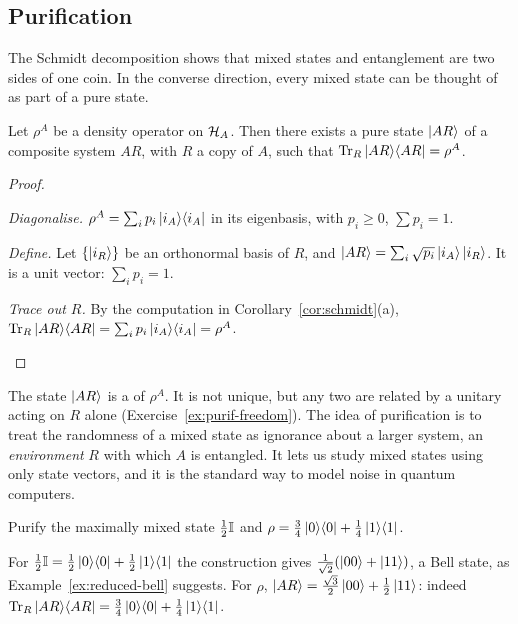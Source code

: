 \subsection{Purification}

The Schmidt decomposition shows that mixed states and entanglement are two sides of one coin. In the converse direction, every mixed state can be thought of as part of a pure state.

\begin{proposition}[Purification]\label{prop:purification}
  Let $\rho^A$ be a density operator on $\mathcal{H}_A$. Then there exists a pure state $\left|AR\right\rangle$ of a composite system $AR$, with $R$ a copy of $A$, such that $\operatorname{Tr}_R\left|AR\right\rangle\!\left\langle AR\right|=\rho^A$.
\end{proposition}
\begin{proof}
  \begin{steps}
    \item \emph{Diagonalise.} $\rho^A=\sum_ip_i\left|i_A\right\rangle\!\left\langle i_A\right|$ in its eigenbasis, with $p_i\ge0$, $\sum p_i=1$.
    \item \emph{Define.} Let $\{\left|i_R\right\rangle\}$ be an orthonormal basis of $R$, and $\left|AR\right\rangle=\sum_i\sqrt{p_i}\left|i_A\right\rangle\left|i_R\right\rangle$. It is a unit vector: $\sum_ip_i=1$.
    \item \emph{Trace out $R$.} By the computation in Corollary~\ref{cor:schmidt}(a), $\operatorname{Tr}_R\left|AR\right\rangle\!\left\langle AR\right|=\sum_ip_i\left|i_A\right\rangle\!\left\langle i_A\right|=\rho^A$. \qedhere
  \end{steps}
\end{proof}

The state $\left|AR\right\rangle$ is a  of $\rho^A$. It is not unique, but any two are related by a unitary acting on $R$ alone (Exercise~\ref{ex:purif-freedom}). The idea of purification is to treat the randomness of a mixed state as ignorance about a larger system, an \emph{environment} $R$ with which $A$ is entangled.
It lets us study mixed states using only state vectors, and it is the standard way to model noise in quantum computers.

\begin{example}\label{ex:purify}
  Purify the maximally mixed state $\tfrac12\mathbb{I}$ and $\rho=\tfrac34\left|0\right\rangle\!\left\langle0\right|+\tfrac14\left|1\right\rangle\!\left\langle1\right|$.
\end{example}
\begin{solution}
  For $\tfrac12\mathbb{I}=\tfrac12\left|0\right\rangle\!\left\langle0\right|+\tfrac12\left|1\right\rangle\!\left\langle1\right|$ the construction gives $\frac1{\sqrt2}(\left|00\right\rangle+\left|11\right\rangle)$, a Bell state, as Example~\ref{ex:reduced-bell} suggests. For $\rho$, $\left|AR\right\rangle=\tfrac{\sqrt3}{2}\left|00\right\rangle+\tfrac12\left|11\right\rangle$: indeed $\operatorname{Tr}_R\left|AR\right\rangle\!\left\langle AR\right|=\tfrac34\left|0\right\rangle\!\left\langle0\right|+\tfrac14\left|1\right\rangle\!\left\langle1\right|$.
\end{solution}

